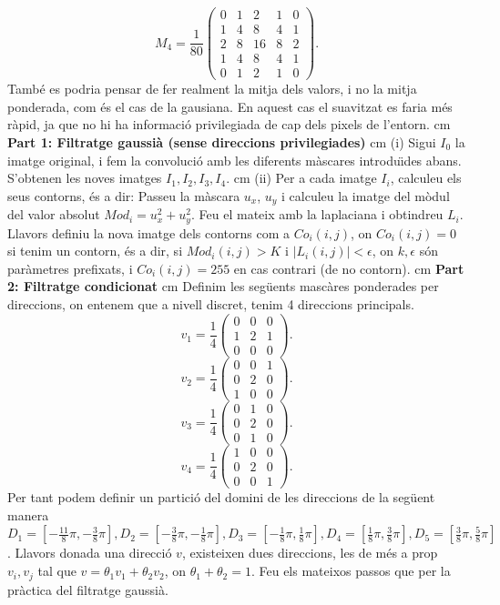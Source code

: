 \documentclass{article}
\begin{document}
 $$
M_4=\frac{1}{80}\left(\begin{array}{ccccc} 0 & 1 & 2 & 1 & 0 \\ 1 & 4 & 8 & 4 & 1 \\ 2 & 8 & 16 & 8 & 2 \\ 1
& 4 & 8 & 4 & 1 \\ 0 & 1 & 2 & 1 & 0 \end{array}\right).$$ Tamb\'{e} es podria pensar de fer realment la
mitja dels valors, i no la mitja ponderada, com \'{e}s el cas de la gausiana. En aquest cas el
suavitzat es faria m\'{e}s r\`{a}pid, ja que no hi ha informaci\'{o} privilegiada de cap dels pixels de
l'entorn. 
 cm
\newpage 
{\bf Part 1: Filtratge gaussi\`{a} (sense direccions privilegiades)} 
cm (i) Sigui $I_0$ la imatge original, i fem la convoluci\'{o} amb les diferents m\`{a}scares introdu\"{\i}des
abans. S'obtenen les noves imatges $I_1, I_2, I_3, I_4$.  cm (ii) Per a cada imatge
$I_i$, calculeu els seus contorns, \'{e}s a dir: Passeu la m\`{a}scara $u_x$, $u_y$ i calculeu la imatge
del m\`{o}dul del valor absolut $Mod_{i}=u_x^2+u_y^2$. Feu el mateix amb la laplaciana i obtindreu
$L_i$. Llavors definiu la nova imatge dels contorns com a $Co_i(i,j)$, on $Co_i(i,j)=0$ si tenim un
contorn, \'{e}s a dir, si $Mod_{i}(i,j) > K$ i $|L_i(i,j)|<\epsilon$, on $k, \epsilon$ s\'{o}n par\`{a}metres
prefixats, i $Co_i(i,j)=255$ en cas contrari (de no contorn).  cm {\bf Part 2: Filtratge
condicionat}  cm Definim les seg\"{u}ents masc\`{a}res ponderades per direccions, on entenem que
a nivell discret, tenim 4 direccions principals.
 $$
v_1=\frac{1}{4}\left(\begin{array}{ccc} 0 & 0 & 0 \\ 1 & 2 & 1 \\ 0 & 0 & 0 \end{array}\right).$$
 $$
v_2=\frac{1}{4}\left(\begin{array}{ccc} 0 & 0 & 1 \\ 0 & 2 & 0 \\ 1 & 0 & 0 \end{array}\right).$$
 $$
v_3=\frac{1}{4}\left(\begin{array}{ccc} 0 & 1 & 0 \\ 0 & 2 & 0 \\ 0 & 1 & 0 \end{array}\right).$$
 $$
v_4=\frac{1}{4}\left(\begin{array}{ccc} 1 & 0 & 0 \\ 0 & 2 & 0 \\ 0 & 0 & 1 \end{array}\right).$$ Per tant podem
definir un partici\'{o} del domini de les direccions de la seg\"{u}ent manera $D_1=[-\frac{11}{8}\pi,
-\frac{3}{8}\pi], D_2=[-\frac{3}{8}\pi, -\frac{1}{8}\pi], D_3=[-\frac{1}{8}\pi, \frac{1}{8}\pi],
D_4=[\frac{1}{8}\pi, \frac{3}{8}\pi], D_5=[\frac{3}{8}\pi, \frac{5}{8}\pi]$. Llavors donada una
direcci\'{o} $v$, existeixen dues direccions, les de m\'{e}s a prop $v_i, v_j$ tal que $v=\theta_1 v_1+
\theta_2 v_2$, on $\theta_1+\theta_2=1$. Feu els mateixos passos que per la pr\`{a}ctica del filtratge
gaussi\`{a}.
\end{document}
